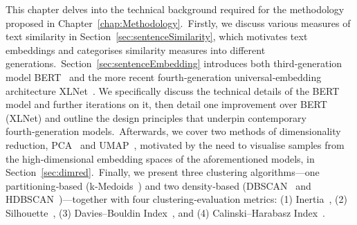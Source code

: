 \documentclass[10pt,oneside]{report}
\begin{document}
This chapter delves into the technical background required for the methodology proposed in Chapter \ref{chap:Methodology}. Firstly, we discuss various measures of text similarity in Section \ref{sec:sentenceSimilarity}, which motivates text embeddings and categorises similarity measures into different generations. Section \ref{sec:sentenceEmbedding} introduces both third‑generation model BERT \cite{devlin2019bert} and the more recent fourth‑generation universal‐embedding architecture XLNet \cite{yang2019xlnet}. We specifically discuss the technical details of the BERT model and further iterations on it, then detail one improvement over BERT (XLNet) and outline the design principles that underpin contemporary fourth‑generation models. Afterwards, we cover two methods of dimensionality reduction,  PCA \cite{pearson1901liii,hotelling1933analysis} and UMAP \cite{mcinnes2018umap}, motivated by the need to visualise samples from the high‑dimensional embedding spaces of the aforementioned models, in Section \ref{sec:dimred}. Finally, we present three clustering algorithms—one partitioning‑based (k‑Medoids \cite{}) and two density‑based (DBSCAN \cite{ester1996density} and HDBSCAN \cite{campello2013density})—together with four clustering‑evaluation metrics: (1) Inertia \cite{}, (2) Silhouette \cite{rousseeuw1987silhouettes}, (3) Davies–Bouldin Index \cite{davies1979cluster}, and (4) Calinski–Harabasz Index \cite{calinski1974dendrite}.  \


\end{document}
